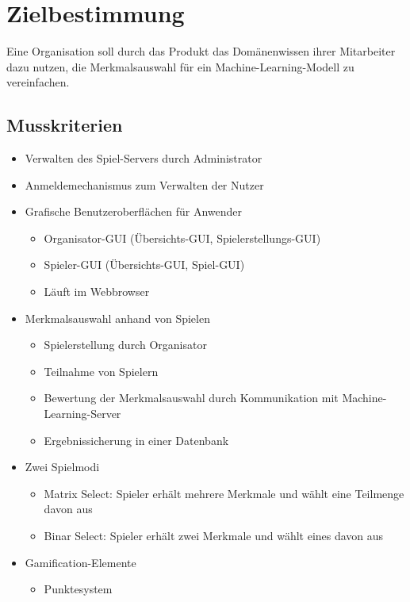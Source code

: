 \documentclass[a4paper]{scrreprt}
\begin{document}
    \chapter{Zielbestimmung}
    Eine Organisation soll durch das \Gls{Produkt} das Domänenwissen ihrer Mitarbeiter dazu nutzen, die Merkmalsauswahl für ein Machine-Learning-Modell zu vereinfachen.



    \section{Musskriterien}
    \begin{itemize} %
        \item Verwalten des Spiel-Servers durch \Gls{Administrator}
    	\item Anmeldemechanismus zum Verwalten der Nutzer %
	\item Grafische Benutzeroberflächen für Anwender 
        \begin{itemize}
            \item Organisator-GUI (Übersichts-GUI, Spielerstellungs-GUI) 
            \item Spieler-GUI (Übersichts-GUI, Spiel-GUI) 
            \item Läuft im Webbrowser 
        \end{itemize}
        \item Merkmalsauswahl anhand von Spielen  %
        \begin{itemize}
            \item Spielerstellung durch \Gls{Organisator}
            \item Teilnahme von \Gls{Spieler}n %
            \item Bewertung der Merkmalsauswahl durch Kommunikation mit Machine-Learning-Server 
            \item Ergebnissicherung in einer Datenbank 
        \end{itemize}
        \item Zwei Spielmodi 
        \begin{itemize}
            \item Matrix Select: \Gls{Spieler} erhält mehrere Merkmale und wählt eine Teilmenge davon aus %
            \item Binar Select: \Gls{Spieler} erhält zwei Merkmale und wählt eines davon aus
        \end{itemize}
        \item Gamification-Elemente
        \begin{itemize}
                  \item Punktesystem 
        \end{itemize}
    \end{itemize}
    \newpage %
\end{document}
